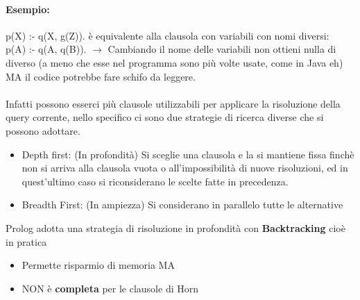 \documentclass[12pt, a4paper, openany, oneside]{book}
\begin{document}
\paragraph{Esempio: } 
p(X) :- q(X, g(Z)).
è equivalente alla clausola con variabili con nomi diversi: \\
p(A) :- q(A, q(B)). $\to$ Cambiando il nome delle variabili non ottieni nulla
di diverso (a meno che esse nel programma sono più volte usate, come in Java eh)
MA il codice potrebbe fare schifo da leggere.
\\ \\
Infatti possono esserci più clausole utilizzabili per applicare la risoluzione
della query corrente, nello specifico ci sono due strategie di ricerca diverse
che si possono adottare.
\begin{itemize}
	\item Depth first: (In profondità) Si sceglie una clausola e la si mantiene fissa 
	finchè non si arriva alla clausola vuota o all'impossibilità di nuove risoluzioni,
	ed in quest'ultimo caso si riconsiderano le scelte fatte in precedenza.
	\item Breadth First: (In ampiezza) Si considerano in parallelo tutte le alternative
\end{itemize}
Prolog adotta una strategia di risoluzione in profondità con \textbf{Backtracking}
cioè in pratica 
\begin{itemize}
	\item Permette risparmio di memoria MA
	\item NON è \textbf{completa} per le clausole di Horn
\end{itemize}
\end{document}
